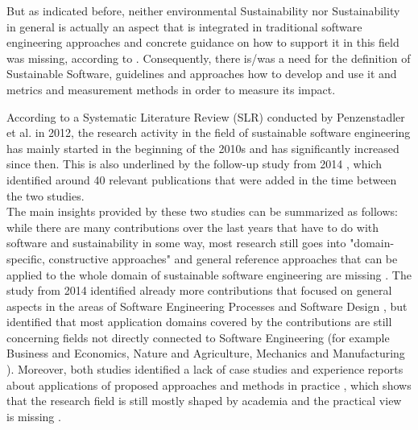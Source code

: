 \documentclass[oribibl]{llncs}
\begin{document}
But as indicated before, neither environmental Sustainability nor Sustainability in general is actually an aspect that is integrated in traditional software engineering approaches and concrete guidance on how to support it in this field was missing, according to \cite{penzenstadler_supporting_2012}. Consequently, there is/was %
a need for the definition of Sustainable Software, guidelines and approaches how to develop and use it and metrics and measurement methods in order to measure its impact.

According to a Systematic Literature Review (SLR) %
conducted by Penzenstadler et al. \cite{penzenstadler_sustainability_2012} in 2012, the research activity in the field of sustainable software engineering has mainly started in the beginning of the 2010s and has significantly increased since then. This is also underlined by the follow-up study from 2014 \cite{penzenstadler_systematic_2014}, which identified around 40 relevant publications that were added%
in the time between the two studies.\\
The main insights provided by these two studies can be summarized as follows: while there are many contributions over the last years that have to do with software and sustainability in some way, most research still goes into "domain-specific, constructive approaches" \cite{penzenstadler_sustainability_2012} and general reference approaches that can be applied to the whole domain of sustainable software engineering are missing \cite{penzenstadler_sustainability_2012}. The study from 2014 identified already more contributions that focused on general aspects in the areas of Software Engineering Processes and Software Design \cite{penzenstadler_systematic_2014}, but identified that most application domains covered by the contributions are still concerning fields not directly connected to Software Engineering (for example Business and Economics, Nature and Agriculture, Mechanics and Manufacturing \cite{penzenstadler_systematic_2014}). %
Moreover, both studies identified a lack of case studies and experience reports about applications of proposed approaches and methods in practice \cite{penzenstadler_sustainability_2012}, which shows that the research field is still mostly shaped by academia and the practical view is missing %
\cite{penzenstadler_systematic_2014}. %
\end{document}
